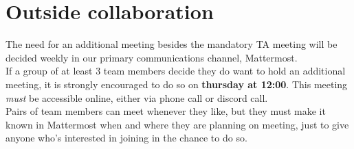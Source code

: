 \section{Outside collaboration}

The need for an additional meeting besides the mandatory TA meeting will be decided weekly in our primary communications channel, Mattermost.\\
If a group of at least 3 team members decide they do want to hold an additional meeting, it is strongly encouraged to do so on \textbf{thursday at 12:00}.
This meeting \textit{must} be accessible online, either via phone call or discord call.\\
Pairs of team members can meet whenever they like, but they must make it known in Mattermost when and where they are planning on meeting,
just to give anyone who's interested in joining in the chance to do so.